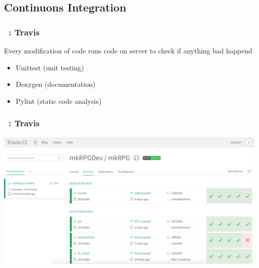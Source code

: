 \documentclass[a4paper, 11pt]{beamer}
\begin{document}
\subsection{Continuons Integration}
\begin{frame}
    \frametitle{\secname~: Travis}
    Every modification of code runs code on server to check if anything bad happend
    \begin{itemize}
    	 \item Unittest (unit testing)
        \item Doxygen (documentation)
        \item Pylint (static code analysis)
    \end{itemize}
\end{frame}

\begin{frame}
    \frametitle{\secname~: Travis}
\includegraphics[scale=0.3]{travis}
\end{frame}
\end{document}
